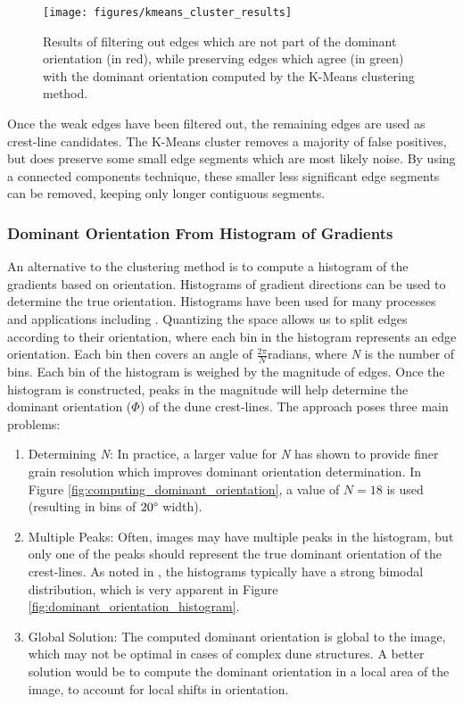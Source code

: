   \begin{figure}
  	\centering
  	\texttt{[image: figures/kmeans\_cluster\_results]}
  	\caption{Results of filtering out edges which are not part of the dominant orientation (in red), while preserving edges which agree (in green) with the dominant orientation computed by the K-Means clustering method.}
  	\label{fig:kmeans_edge_results}
  \end{figure}
  
  Once the weak edges have been filtered out, the remaining edges are used as crest-line candidates. The K-Means cluster removes a majority of false positives, but does preserve some small edge segments which are most likely noise. By using a connected components technique, these smaller less significant edge segments can be removed, keeping only longer contiguous segments.
  
  \subsubsection{Dominant Orientation From Histogram of Gradients} \label{subsec:dominant_orientation_histogram_of_gradients}
  
An alternative to the clustering method is to compute a histogram of the gradients based on orientation. Histograms of gradient directions can be used to determine the true orientation. Histograms have been used for many processes and applications including \cite{lowe_sift_paper, dalal_histogram_oriented_gradients_human_detection, hu_gradient_field_descriptor}. Quantizing the space allows us to split edges according to their orientation, where each bin in the histogram represents an edge orientation. Each bin then covers an angle of $\frac{2\pi}{N}$radians, where \emph{N} is the number of bins. Each bin of the histogram is weighed by the magnitude of edges. Once the histogram is constructed, peaks in the magnitude will help determine the dominant orientation ($\varPhi$) of the dune crest-lines. The approach poses three main problems:
  
  \begin{enumerate}
  	\item Determining \emph{N}: In practice, a larger value for \emph{N} has shown to provide finer grain resolution which improves dominant orientation determination. In Figure \ref{fig:computing_dominant_orientation}, a value of $N=18$ is used (resulting in bins of $20\degree$ width).
  	\item Multiple Peaks: Often, images may have multiple peaks in the histogram, but only one of the peaks should represent the true dominant orientation of the crest-lines. As noted in \cite{2015_automated_mapping_of_linear_dunefield}, the histograms typically have a strong bimodal distribution, which is very apparent in Figure \ref{fig:dominant_orientation_histogram}.
  	\item Global Solution: The computed dominant orientation is global to the image, which may not be optimal in cases of complex dune structures. A better solution would be to compute the dominant orientation in a local area of the image, to account for local shifts in orientation.
  \end{enumerate}
  
